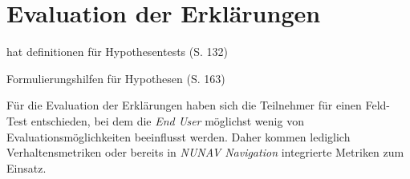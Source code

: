 \section{Evaluation der Erklärungen}

\cite{wohlin2012experimentation} hat definitionen für Hypothesentests (S. 132)

\cite{wohlin2012experimentation} Formulierungshilfen für Hypothesen (S. 163)

Für die Evaluation der Erklärungen haben sich die Teilnehmer für einen Feld-Test entschieden, bei dem die \textit{End User} möglichst wenig von Evaluationsmöglichkeiten beeinflusst werden. Daher kommen lediglich Verhaltensmetriken oder bereits in \textit{NUNAV Navigation} integrierte Metriken zum Einsatz.





